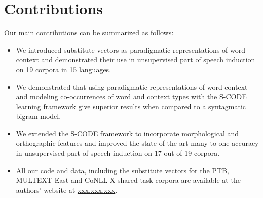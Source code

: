 \section{Contributions}
\label{sec:contrib}

Our main contributions can be summarized as follows:
\begin{itemize}
\item We introduced substitute vectors as paradigmatic representations
  of word context and demonstrated their use in unsupervised part of
  speech induction on 19 corpora in 15 languages.
\item We demonstrated that using paradigmatic representations of word
  context and modeling co-occurrences of word and context types with
  the S-CODE learning framework give superior results when compared to
  a syntagmatic bigram model.
\item We extended the S-CODE framework to incorporate morphological
  and orthographic features and improved the state-of-the-art
  many-to-one accuracy in unsupervised part of speech induction on 17
  out of 19 corpora.
\item All our code and data, including the substitute vectors for the
  PTB, MULTEXT-East and CoNLL-X shared task corpora are available
  at the authors' website at \mbox{\url{xxx.xxx.xxx}}.
\end{itemize}


